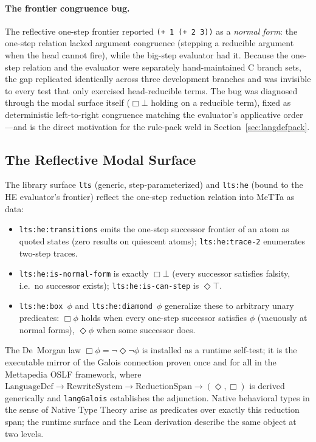 \documentclass[11pt]{article}
\newcommand{\code}[1]{\texttt{#1}}
\newcommand{\HE}{\textup{HE}}
\begin{document}
\paragraph{The frontier congruence bug.}  The reflective one-step
frontier reported \code{(+ 1 (+ 2 3))} as a \emph{normal form}: the
one-step relation lacked argument congruence (stepping a reducible
argument when the head cannot fire), while the big-step evaluator had
it.  Because the one-step relation and the evaluator were separately
hand-maintained C branch sets, the gap replicated identically across
three development branches and was invisible to every test that only
exercised head-reducible terms.  The bug was diagnosed through the
modal surface itself ($\Box\bot$ holding on a reducible term), fixed
as deterministic left-to-right congruence matching the evaluator's
applicative order---and is the direct motivation for the rule-pack
weld in Section~\ref{sec:langdefpack}.

\subsection{The Reflective Modal Surface}
\label{sec:modal}

The library surface \code{lts} (generic, step-parameterized) and
\code{lts:he} (bound to the \HE{} evaluator's frontier) reflect the
one-step reduction relation into MeTTa as data:

\begin{itemize}
\item \code{lts:he:transitions} emits the one-step successor frontier
  of an atom as quoted states (zero results on quiescent atoms);
  \code{lts:he:trace-2} enumerates two-step traces.
\item \code{lts:he:is-normal-form} is exactly $\Box\bot$ (every
  successor satisfies falsity, i.e.\ no successor exists);
  \code{lts:he:is-can-step} is $\Diamond\top$.
\item \code{lts:he:box}~$\phi$ and \code{lts:he:diamond}~$\phi$
  generalize these to arbitrary unary predicates: $\Box\phi$ holds
  when every one-step successor satisfies $\phi$ (vacuously at normal
  forms), $\Diamond\phi$ when some successor does.
\end{itemize}

The De~Morgan law $\Box\phi = \lnot\Diamond\lnot\phi$ is installed as
a runtime self-test; it is the executable mirror of the Galois
connection proven once and for all in the Mettapedia OSLF framework,
where $\mathrm{LanguageDef}\to\mathrm{RewriteSystem}\to
\mathrm{ReductionSpan}\to(\Diamond,\Box)$ is derived generically and
\code{langGalois} establishes the adjunction.  Native behavioral types
in the sense of Native Type Theory arise as predicates over exactly
this reduction span; the runtime surface and the Lean derivation
describe the same object at two levels.
\end{document}
